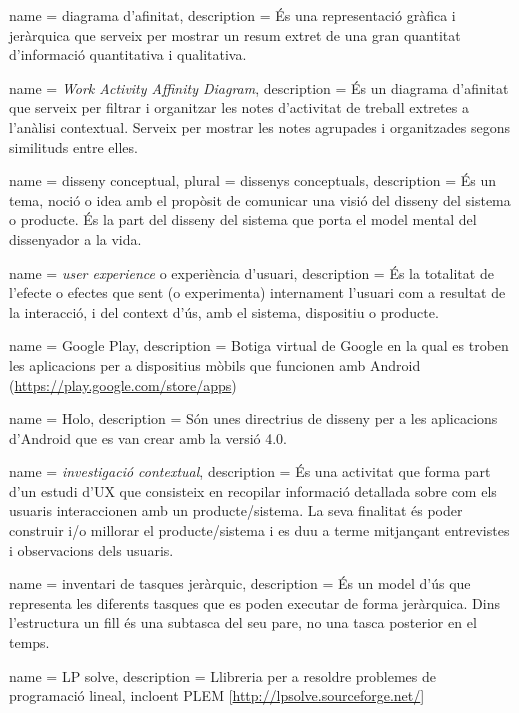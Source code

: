 {
name = diagrama d'afinitat, description = {És una representació gràfica i jeràrquica que serveix per mostrar un resum extret de una gran quantitat d'informació quantitativa i qualitativa.}
}

{
name = \textit{Work Activity Affinity Diagram}, description = {És un diagrama d'afinitat que serveix per filtrar i organitzar les notes d'activitat de treball extretes a l'anàlisi contextual. Serveix per mostrar les notes agrupades i organitzades segons similituds entre elles.}
}

{
name = disseny conceptual, plural = dissenys conceptuals, description = {És un tema, noció o idea amb el propòsit de comunicar una visió del disseny del sistema o producte. És la part del disseny del sistema que porta el model mental del dissenyador a la vida.}
}

{
name = \textit{user experience} o experiència d'usuari, description = {És la totalitat de l'efecte o efectes que sent (o experimenta) internament l'usuari com a resultat de la interacció, i del context d'ús, amb el sistema, dispositiu o producte.}
}

{
name = Google Play, description = {Botiga virtual de Google en la qual es troben les aplicacions per a dispositius mòbils que funcionen amb \gls{Android} (\url{https://play.google.com/store/apps})}
}

{
name = Holo, description = {Són unes directrius de disseny per a les aplicacions d'\gls{Android} que es van crear amb la versió 4.0.}
}

{
name = \textit{investigació contextual}, description = {És una activitat que forma part d'un estudi d'UX que consisteix en recopilar informació detallada sobre com els usuaris interaccionen amb un producte/sistema. La seva finalitat és poder construir i/o millorar el producte/sistema i es duu a terme mitjançant entrevistes i observacions dels usuaris.}
}

{
name = inventari de tasques jeràrquic, description = {És un model d'ús que representa les diferents tasques que es poden executar de forma jeràrquica. Dins l'estructura un fill és una subtasca del seu pare, no una tasca posterior en el temps.}
}

{
name = LP solve, description = {Llibreria per a resoldre problemes de programació lineal, incloent PLEM [\url{http://lpsolve.sourceforge.net/}]}
}

